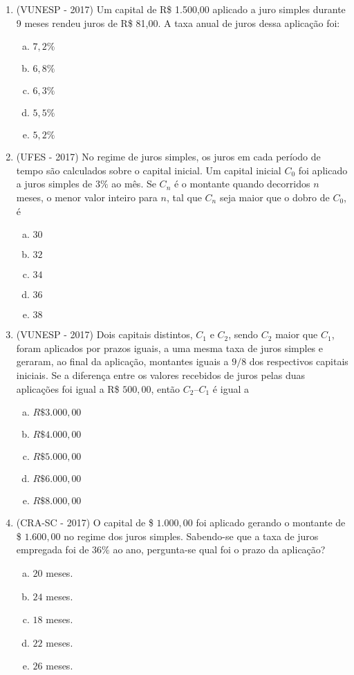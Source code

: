 \begin{enumerate}
  \item (VUNESP - 2017) Um capital de R\$ 1.500,00 aplicado a juro simples durante 9 meses rendeu juros de R\$ 81,00. A taxa anual de juros dessa aplicação foi:
  \begin{enumerate}[a)]
  \item $7,2\%$
  \item $6,8\%$
  \item $6,3\%$
  \item $5,5\%$
  \item $5,2\%$
  \end{enumerate}
  
  \item (UFES - 2017) No regime de juros simples, os juros em cada período de tempo são calculados sobre o capital inicial. Um capital inicial $C_0$ foi aplicado a juros simples de $3\%$ ao mês. Se $C_n$ é o montante quando decorridos $n$ meses, o menor valor inteiro para $n$, tal que $C_n$ seja maior que o dobro de $C_0$, é
  \begin{enumerate}[a)]
  \item $30$
  \item $32$
  \item $34$
  \item $36$
  \item $38$
  \end{enumerate}
  
  \item (VUNESP - 2017) Dois capitais distintos, $C_1$ e $C_2$, sendo $C_2$ maior que $C_1$, foram aplicados por prazos iguais, a uma mesma taxa de juros simples e geraram, ao final da aplicação, montantes iguais a $9/8$ dos respectivos capitais iniciais. Se a diferença entre os valores recebidos de juros pelas duas aplicações foi igual a R\$ $500,00$, então $C_2 – C_1$ é igual a 
  \begin{enumerate}[a)]
  \item $R\$ 3.000,00$
  \item $R\$ 4.000,00$
  \item $R\$ 5.000,00$
  \item $R\$ 6.000,00$
  \item $R\$ 8.000,00$
  \end{enumerate}
  
  \item (CRA-SC - 2017) O capital de \$ $1.000,00$ foi aplicado gerando o montante de \$ $1.600,00$ no regime dos juros simples. Sabendo-se que a taxa de juros empregada foi de $36\%$ ao ano, pergunta-se qual foi o prazo da aplicação?
  \begin{enumerate}[a)]
  \item $20$ meses.
  \item $24$ meses.
  \item $18$ meses.
  \item $22$ meses.
  \item $26$ meses.
  \end{enumerate}
  

\end{enumerate}
